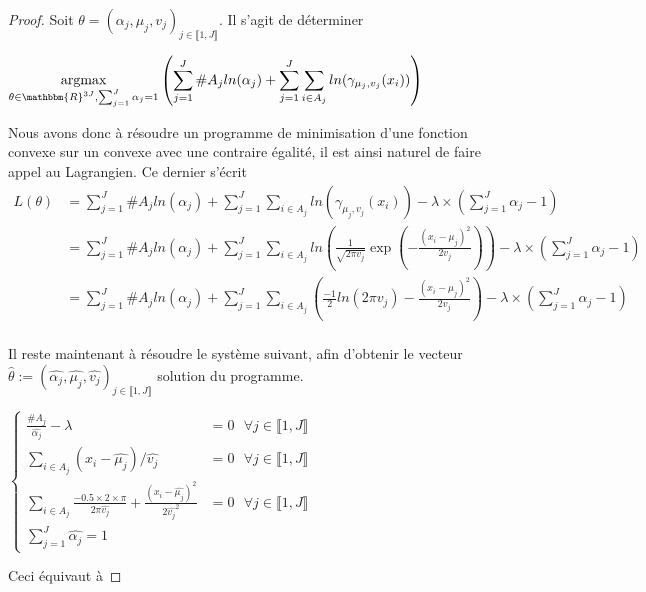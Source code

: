 \documentclass[frenchb]{report}
\newcommand{\R}{\mathbbm{R}}
\newcommand{\1}{\mathbbm{1}}
\theoremstyle{definition}\newtheorem{defn}{Définition}
\theoremstyle{definition}\newtheorem{exm}{Exemple}
\theoremstyle{definition}\newtheorem{nota}{Notation}
\theoremstyle{definition}\newtheorem{rem}{Remarque}
\begin{document}
\begin{proof}
Soit $\theta = (\alpha_j, \mu_j, v_j)_{j \in \llbracket 1,J \rrbracket}$. Il s'agit de déterminer 
\begin{center}
	$\underset{\theta\in\R^{3J}, \sum_{j=1}^J\alpha_j = 1}{\text{argmax}}\left(\displaystyle\sum_{j=1}^J \#A_j ln(\alpha_j)+ \sum_{j=1}^J\sum_{i\in A_j} ln(\gamma_{\mu_j, v_j}(x_i))\right)$
\end{center}
Nous avons donc à résoudre un programme de minimisation d'une fonction convexe sur un convexe avec une contraire égalité, il est ainsi naturel de faire appel au Lagrangien. \newline 
Ce dernier s'écrit
\begin{align*} 
L(\theta) &= \displaystyle\sum_{j=1}^J \#A_j ln(\alpha_j)+ \sum_{j=1}^J\sum_{i\in A_j} ln(\gamma_{\mu_j, v_j}(x_i)) - \lambda\times\left(\sum_{j=1}^J\alpha_j - 1\right)\\
&= \displaystyle\sum_{j=1}^J \#A_j ln(\alpha_j)+ \sum_{j=1}^J\sum_{i\in A_j} ln\left(\frac{1}{\sqrt{2\pi v_j}}\exp\left(-\frac{\left(x_i -\mu_j\right)^2}{2v_j} \right)\right) - \lambda\times\left(\sum_{j=1}^J\alpha_j - 1\right)\\
&= \displaystyle\sum_{j=1}^J \#A_j ln(\alpha_j)+ \sum_{j=1}^J\sum_{i\in A_j}\left( \frac{-1}{2}ln(2\pi v_j) -\frac{(x_i-\mu_j)^2}{2v_j}\right) - \lambda\times\left(\sum_{j=1}^J\alpha_j - 1\right)\\
\end{align*}

Il reste maintenant à résoudre le système suivant, afin d'obtenir le vecteur $\hat{\theta} := (\hat{\alpha_j}, \hat{\mu_j}, \hat{v_j})_{j\in\llbracket 1,J \rrbracket}$ solution du programme.

$
\begin{cases}
\displaystyle\frac{\#A_j}{\hat{\alpha_j}} - \lambda &= 0 \text{ } \forall j \in \llbracket 1,J \rrbracket \\
\displaystyle\sum_{i\in A_j} (x_i-\hat{\mu_j})/\hat{v_j} & = 0 \text{ } \forall j \in \llbracket 1,J \rrbracket \\
\displaystyle\sum_{i\in A_j} \frac{-0.5 \times 2 \times \pi}{2\pi \hat{v_j}} +\frac{(x_i-\hat{\mu_j})^2}{2\hat{v_j}^2} &= 0 \text{ } \forall j \in \llbracket 1,J \rrbracket\\
\displaystyle\sum_{j=1}^J \hat{\alpha_j} = 1
\end{cases}
$

Ceci équivaut à 


\end{proof}
\end{document}
